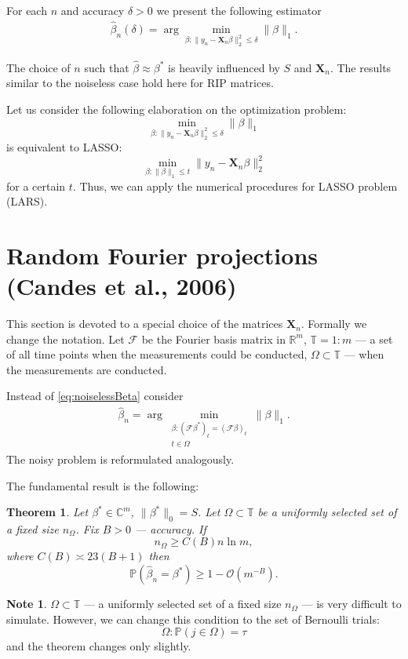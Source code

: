 \documentclass[11pt]{article}
\numberwithin{equation}{section}
\newtheorem{theorem}{Theorem}[section]
\theoremstyle{definition}
\newtheorem{remark}{Note}[section]
\begin{document}
For each $n$ and accuracy $\delta > 0$ we present the following estimator
\begin{gather*}
    \hat \beta_n(\delta) = \arg \min_{\beta: \|y_n - \mathbf X_n \beta\|_2^2 \leqslant \delta} \|\beta\|_1.
\end{gather*}

The choice of $n$ such that $\hat \beta \approx \beta^*$ is heavily influenced by $S$ and $\mathbf X_n$.
The results similar to the noiseless case hold here for RIP matrices.

Let us consider the following elaboration on the optimization problem:
$$ \min_{\beta: \|y_n - \mathbf X_n \beta\|_2^2 \leqslant \delta} \|\beta\|_1 $$
is equivalent to LASSO:
$$ \min_{\beta: \|\beta\|_1 \leqslant t} \|y_n - \mathbf X_n \beta\|_2^2 $$
for a certain $t$.
Thus, we can apply the numerical procedures for LASSO problem (LARS).

\section{Random Fourier projections (Candes et al., 2006)}

This section is devoted to a special choice of the matrices $\mathbf X_n$.
Formally we change the notation.
Let $\mathcal F$ be the Fourier basis matrix in $\mathbb R^m$, $\mathbb T = 1:m$ --- a set of all time points when the measurements could be conducted, $\Omega \subset \mathbb T$ --- when the measurements are conducted.

Instead of \eqref{eq:noiselessBeta} consider
\begin{gather}
    \hat \beta_n = \arg \min_{\substack{\beta: (\mathcal F \beta^*)_t = (\mathcal F \beta)_t \\ t \in \Omega}} \|\beta\|_1.
\end{gather}
The noisy problem is reformulated analogously.

The fundamental result is the following:
\begin{theorem}
    Let $\beta^* \in \mathbb C^m$, $\|\beta^*\|_0 = S$. Let $\Omega \subset \mathbb T$ be a uniformly selected set of a fixed size $n_\Omega$.
    Fix $B > 0$ --- accuracy.
    If
    $$ n_\Omega \geq C(B) n \ln m, $$
    where $C(B) \asymp 23(B + 1)$ then
    $$ \mathbb P(\hat \beta_n = \beta^*) \geq 1 - \mathcal O(m^{-B}). $$
\end{theorem}

\begin{remark}
    $\Omega \subset \mathbb T$ --- a uniformly selected set of a fixed size $n_\Omega$ --- is very difficult to simulate.
    However, we can change this condition to the set of Bernoulli trials:
    $$ \Omega: \mathbb P(j \in \Omega) = \tau $$
    and the theorem changes only slightly.
\end{remark}
\end{document}
